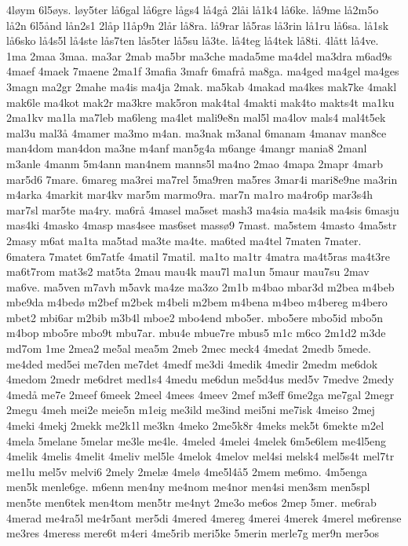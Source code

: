 {4l^^f8ym
6l5^^f8ys.
l^^f8y5ter
l^^e56gal
l^^e56gre
l^^e5gs4
l^^e54g^^e5
2l^^e5i
l^^e51k4
l^^e56ke.
l^^e59me
l^^e52m5o
l^^e52n
6l5^^e5nd
l^^e5n2s1
2l^^e5p
l1^^e5p9n
2l^^e5r
l^^e58ra.
l^^e59rar
l^^e55ras
l^^e53rin
l^^e51ru
l^^e56sa.
l^^e51sk
l^^e56sko
l^^e54s5l
l^^e54ste
l^^e5s7ten
l^^e5s5ter
l^^e55su
l^^e53te.
l^^e54teg
l^^e54tek
l^^e58ti.
4l^^e5tt
l^^e54ve.
1ma
2maa
3maa.
ma3ar
2mab
ma5br
ma3che
mada5me
ma4del
ma3dra
m6ad9s
4maef
4maek
7maene
2ma1f
3mafia
3mafr
6mafr^^e5
ma8ga.
ma4ged
ma4gel
ma4ges
3magn
ma2gr
2mahe
ma4is
ma4ja
2mak.
ma5kab
4makad
ma4kes
mak7ke
4makl
mak6le
ma4kot
mak2r
ma3kre
mak5ron
mak4tal
4makti
mak4to
makts4t
ma1ku
2ma1kv
ma1la
ma7leb
ma6leng
ma4let
mali9e8n
mal5l
ma4lov
mals4
mal4t5ek
mal3u
mal3^^e5
4mamer
ma3mo
m4an.
ma3nak
m3anal
6manam
4manav
man8ce
man4dom
man4don
ma3ne
m4anf
man5g4a
m6ange
4mangr
mania8
2manl
m3anle
4manm
5m4ann
man4nem
manns5l
ma4no
2mao
4mapa
2mapr
4marb
mar5d6
7mare.
6mareg
ma3rei
ma7rel
5ma9ren
ma5res
3mar4i
mari8e9ne
ma3rin
m4arka
4markit
mar4kv
mar5m
marmo9ra.
mar7n
ma1ro
ma4ro6p
mar3s4h
mar7sl
mar5te
ma4ry.
ma6r^^e5
4masel
ma5set
mash3
ma4sia
ma4sik
ma4sis
6masju
mas4ki
4masko
4masp
mas4see
mas6set
mass^^f89
7mast.
ma5stem
4masto
4ma5str
2masy
m6at
ma1ta
ma5tad
ma3te
ma4te.
ma6ted
ma4tel
7maten
7mater.
6matera
7matet
6m7atfe
4matil
7matil.
ma1to
ma1tr
4matra
ma4t5ras
ma4t3re
ma6t7rom
mat3s2
mat5ta
2mau
mau4k
mau7l
ma1un
5maur
mau7su
2mav
ma6ve.
ma5ven
m7avh
m5avk
ma4ze
ma3zo
2m1b
m4bao
mbar3d
m2bea
m4beb
mbe9da
m4bed^^f8
m2bef
m2bek
m4beli
m2bem
m4bena
m4beo
m4bereg
m4bero
mbet2
mbi6ar
m2bib
m3b4l
mboe2
mbo4end
mbo5er.
mbo5ere
mbo5id
mbo5n
m4bop
mbo5re
mbo9t
mbu7ar.
mbu4e
mbue7re
mbus5
m1c
m6co
2m1d2
m3de
md7om
1me
2mea2
me5al
mea5m
2meb
2mec
meck4
4medat
2medb
5mede.
me4ded
med5ei
me7den
me7det
4medf
me3di
4medik
4medir
2medm
me6dok
4medom
2medr
me6dret
med1s4
4medu
me6dun
me5d4us
med5v
7medve
2medy
4med^^e5
me7e
2meef
6meek
2meel
4mees
4meev
2mef
m3eff
6me2ga
me7gal
2megr
2megu
4meh
mei2e
meie5n
m1eig
me3ild
me3ind
mei5ni
me7isk
4meiso
2mej
4meki
4mekj
2mekk
me2k1l
me3kn
4meko
2me5k8r
4meks
mek5t
6mekte
m2el
4mela
5melane
5melar
me3le
me4le.
4meled
4melei
4melek
6m5e6lem
me4l5eng
4melik
4melis
4melit
4meliv
mel5le
4melok
4melov
mel4si
melsk4
mel5s4t
mel7tr
me1lu
mel5v
melvi6
2mely
2mel^^e6
4mel^^f8
4me5l4^^e55
2mem
me6mo.
4m5enga
men5k
menle6ge.
m6enn
men4ny
me4nom
me4nor
men4si
men3sm
men5spl
men5te
men6tek
men4tom
men5tr
me4nyt
2me3o
me6os
2mep
5mer.
me6rab
4merad
me4ra5l
me4r5ant
mer5di
4mered
4mereg
4merei
4merek
4merel
me6rense
me3res
4meress
mere6t
m4eri
4me5rib
meri5ke
5merin
merle7g
mer9n
mer5os
}
